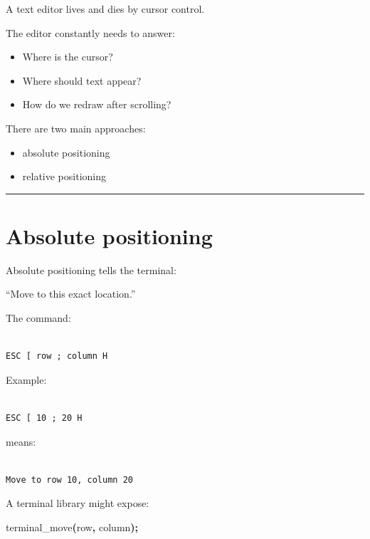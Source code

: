 \documentclass[
  oneside,
  openany]{book}
\newenvironment{Shaded}{\begin{snugshade}}{\end{snugshade}}
\newcommand{\NormalTok}[1]{#1}
\newcommand{\OperatorTok}[1]{\textcolor[rgb]{0.81,0.36,0.00}{\textbf{#1}}}
\providecommand{\tightlist}{%
  \setlength{\itemsep}{0pt}\setlength{\parskip}{0pt}}
\begin{document}
A text editor lives and dies by cursor control.

The editor constantly needs to answer:

\begin{itemize}
\tightlist
\item
  Where is the cursor?
\item
  Where should text appear?
\item
  How do we redraw after scrolling?
\end{itemize}

There are two main approaches:

\begin{itemize}
\tightlist
\item
  absolute positioning
\item
  relative positioning
\end{itemize}

\begin{center}\rule{0.5\linewidth}{0.5pt}\end{center}

\hypertarget{absolute-positioning}{%
\section{Absolute positioning}\label{absolute-positioning}}

Absolute positioning tells the terminal:

``Move to this exact location.''

The command:

\begin{verbatim}

ESC [ row ; column H
\end{verbatim}

Example:

\begin{verbatim}

ESC [ 10 ; 20 H
\end{verbatim}

means:

\begin{verbatim}

Move to row 10, column 20
\end{verbatim}

A terminal library might expose:

\begin{Shaded}
\begin{Highlighting}[]
\NormalTok{terminal\_move}\OperatorTok{(}\NormalTok{row}\OperatorTok{,}\NormalTok{ column}\OperatorTok{);}
\end{Highlighting}
\end{Shaded}
\end{document}

